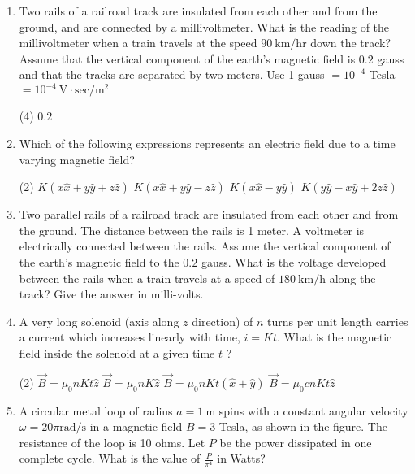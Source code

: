 \begin{enumerate}
	\item Two rails of a railroad track are insulated from each other and from the ground, and are connected by a millivoltmeter. What is the reading of the millivoltmeter when a train travels at the speed $90 \mathrm{~km} / \mathrm{hr}$ down the track? Assume that the vertical component of the earth's magnetic field is $0.2$ gauss and that the tracks are separated by two meters. Use 1 gauss $=10^{-4}$ Tesla $=10^{-4} \mathrm{~V} \cdot \mathrm{sec} / \mathrm{m}^{2}$
	{}
	 \begin{tasks}(4)
		\task[\textbf{c.}]$0.2$
	\end{tasks}
\item 	Which of the following expressions represents an electric field due to a time varying magnetic field?
	{}
 \begin{tasks}(2)
	\task[\textbf{a.}]$K(x \hat{x}+y \hat{y}+z \hat{z})$
	\task[\textbf{b.}] $K(x \hat{x}+y \hat{y}-z \hat{z})$
	\task[\textbf{c.}]$K(x \hat{x}-y \hat{y})$
	\task[\textbf{d.}]$K(y \hat{y}-x \hat{y}+2 z \hat{z})$ 
\end{tasks}	
\item Two parallel rails of a railroad track are insulated from each other and from the ground. The distance between the rails is 1 meter. A voltmeter is electrically connected between the rails. Assume the vertical component of the earth's magnetic field to the $0.2$ gauss. What is the voltage developed between the rails when a train travels at a speed of $180 \mathrm{~km} / \mathrm{h}$ along the track? Give the answer in milli-volts.
	{}
\item 	A very long solenoid (axis along $z$ direction) of $n$ turns per unit length carries a current which increases linearly with time, $i=K t$. What is the magnetic field inside the solenoid at a given time $t$ ?
	{}
 \begin{tasks}(2)
	\task[\textbf{a.}]$\vec{B}=\mu_{0} n K t \hat{z}$
	\task[\textbf{b.}]$\vec{B}=\mu_{0} n K \hat{z}$
	\task[\textbf{c.}]$\vec{B}=\mu_{0} n K t(\hat{x}+\hat{y})$
	\task[\textbf{d.}] $\vec{B}=\mu_{0} c n K t \hat{z}$
\end{tasks}	
\item 	A circular metal loop of radius $a=1 \mathrm{~m}$ spins with a constant angular velocity $\omega=20 \pi \mathrm{rad} / \mathrm{s}$ in a magnetic field $B=3$ Tesla, as shown in the figure. The resistance of the loop is 10 ohms. Let $P$ be the power dissipated in one complete cycle. What is the value of $\frac{P}{\pi^{4}}$ in Watts?

\end{enumerate}
